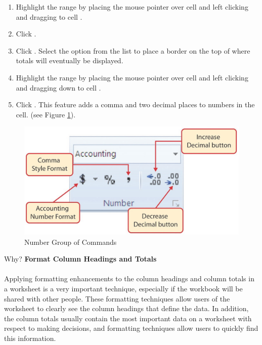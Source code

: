 \begin{enumerate}[resume]
	\item Highlight the range  by placing the mouse pointer over cell  and left clicking and dragging to cell .
	\item Click .
	\item Click . Select the  option from the list to place a border on the top of  where totals will eventually be displayed.
	\item Highlight the range  by placing the mouse pointer over cell  and left clicking and dragging down to cell .
	\item Click . This feature adds a comma and two decimal places to numbers in the cell. (see Figure \ref{01:fig35}).
\end{enumerate}

\begin{figure}[H]
	\centering
	\includegraphics[width=\maxwidth{.95\linewidth}]{gfx/ch01_fig35}
	\caption{Number Group of Commands}
	\label{01:fig35}
\end{figure}

\begin{center}
	\begin{infobox}{Why?}
		\textbf{Format Column Headings and Totals}
		\\
		\\
		Applying formatting enhancements to the column headings and column totals in a worksheet is a very important technique, especially if the workbook will be shared with other people. These formatting techniques allow users of the worksheet to clearly see the column headings that define the data. In addition, the column totals usually contain the most important data on a worksheet with respect to making decisions, and formatting techniques allow users to quickly find this information.
	\end{infobox}
\end{center}


